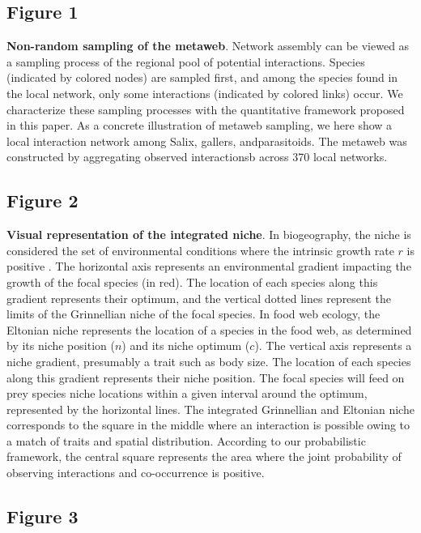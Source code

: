 \documentclass[12pt]{article}
\begin{document}
\subsection*{Figure 1}

\textbf{Non-random sampling of the metaweb}. Network assembly can be viewed as
a sampling process of the regional pool of potential interactions. Species
(indicated by colored nodes) are sampled first, and among the species found in
the local network, only some interactions (indicated by colored links) occur.
We characterize these sampling processes with the quantitative framework
proposed in this paper. As a concrete illustration of metaweb sampling, we
here show a local interaction network among Salix, gallers, andparasitoids.
The metaweb was constructed by aggregating observed interactionsb across 370
local networks. 

\subsection*{Figure 2}

\textbf{Visual representation of the integrated niche}. In biogeography, the
niche is considered the set of environmental conditions where the intrinsic
growth rate $r$ is positive \citep{Holt2009}. The horizontal axis represents
an environmental gradient impacting the growth of the focal species (in red).
The location of each species along this gradient represents their optimum, and
the vertical dotted lines represent the limits of the Grinnellian niche of the
focal species. In food web ecology, the Eltonian niche represents the location
of a species in the food web, as determined by its niche position ($n$) and
its niche optimum ($c$). The vertical axis represents a niche gradient,
presumably a trait such as body size. The location of each species along this
gradient represents their niche position. The focal species will feed on prey
species  niche locations within a given interval around the optimum,
represented by the horizontal lines. The integrated Grinnellian and Eltonian
niche corresponds to the square in the middle where an interaction is possible
owing to a match of traits and spatial distribution. According to our
probabilistic framework, the central square represents the area where the
joint probability of observing interactions and co-occurrence is positive.

\subsection*{Figure 3}
\end{document}

